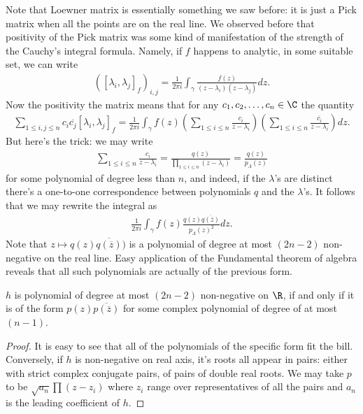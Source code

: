 Note that Loewner matrix is essentially something we saw before: it is just a Pick matrix when all the points are on the real line. We observed before that positivity of the Pick matrix was some kind of manifestation of the strength of the Cauchy's integral formula. Namely, if $f$ happens to analytic, in some suitable set, we can write
\begin{align*}
	\left([\lambda_{i}, \lambda_{j}]_{f}\right)_{i, j} = \frac{1}{2 \pi i}\int_{\gamma} \frac{f(z)}{(z - \lambda_{i})(z - \lambda_{j})} dz.
\end{align*}
Now the positivity the matrix means that for any $c_{1}, c_{2}, \ldots, c_{n} \in \C$ the quantity
\begin{align*}
	\sum_{1 \leq i, j \leq n} c_{i} \overline{c_{j}} [\lambda_{i}, \lambda_{j}]_{f} = \frac{1}{2 \pi i}\int_{\gamma}f(z) \left(\sum_{1 \leq i \leq n} \frac{c_{i}}{z - \lambda_{i}}\right) \left( \sum_{1 \leq i \leq n} \frac{\overline{c_{i}}}{z - \lambda_{i}}\right)dz.
\end{align*}
But here's the trick: we may write
\begin{align*}
	\sum_{1 \leq i \leq n} \frac{c_{i}}{z - \lambda_{i}} = \frac{q(z)}{\prod_{1 \leq i \leq n} (z - \lambda_{i})} = \frac{q(z)}{p_{\Lambda}(z)}
\end{align*}
for some polynomial of degree less than $n$, and indeed, if the $\lambda$'s are distinct there's a one-to-one correspondence between polynomials $q$ and the $\lambda$'s. It follows that we may rewrite the integral as
\begin{align*}
\frac{1}{2 \pi i}\int_{\gamma}f(z) \frac{q(z) \overline{q(\overline{z})}}{p_{\Lambda}(z)^2}dz.
\end{align*}
Note that $z \mapsto q(z)\overline{q(\overline{z})})$ is a polynomial of degree at most $(2 n - 2)$ non-negative on the real line. Easy application of the Fundamental theorem of algebra reveals that all such polynomials are actually of the previous form.

\begin{lem}\label{polynomial_lemma}
	$h$ is polynomial of degree at most $(2 n - 2)$ non-negative on $\R$, if and only if it is of the form $p(z) \overline{p(\overline{z})}$ for some complex polynomial of degree of at most $(n - 1)$.
\end{lem}
\begin{proof}
	It is easy to see that all of the polynomials of the specific form fit the bill. Conversely, if $h$ is non-negative on real axis, it's roots all appear in pairs: either with strict complex conjugate pairs, of pairs of double real roots. We may take $p$ to be $\sqrt{a_{n}}\prod (z - z_{i})$ where $z_{i}$ range over representatives of all the pairs and $a_{n}$ is the leading coefficient of $h$.
\end{proof}

